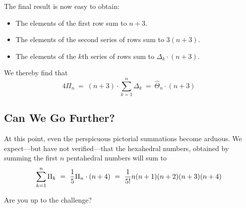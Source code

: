 The final result is now easy to obtain:
\begin{itemize}
\item 
The elements of the first row sum to $n+3$.
\item
The elements of the second series of rows sum to $3 (n+3)$. 
\item
The elements of the $k$th series of rows sum to $\Delta_k \cdot (n+3)$.
\end{itemize}
We thereby find that
\[
4 \Pi_n \ = \ (n+3) \cdot \sum_{k=1}^{n} \Delta_k \ = \ \widehat{\Theta}_n \cdot (n+3)
\]

\subsection{Can We Go Further?}

At this point, even the perspicuous pictorial summations become arduous.  We expect---but have not verified---that the hexahedral numbers, obtained by summing the first $n$ pentahedral numbers will sum to
\[ \sum_{k=1}^n \Pi_k \ = \ {1 \over 5} \Pi_n \cdot (n+4) \ = \ 
{1 \over 5!} n (n+1) (n+2) (n+3) (n+4)
\]

Are you up to the challenge?

